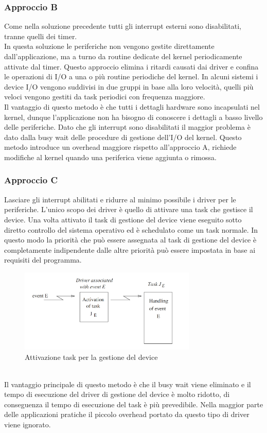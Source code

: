\documentclass[12pt]{article}
\begin{document}
\subsubsection{Approccio B}
Come nella soluzione precedente tutti gli interrupt esterni sono disabilitati,
tranne quelli dei timer.\\
In questa soluzione le periferiche non vengono gestite direttamente dall'applicazione, ma a turno da routine dedicate del kernel 
periodicamente attivate dal timer.
Questo approccio elimina i ritardi causati dai driver e confina le operazioni di I/O a una o più routine periodiche del kernel.
In alcuni sistemi i device I/O vengono suddivisi in due gruppi in base alla loro velocità, quelli più veloci vengono gestiti da task 
periodici con frequenza maggiore.
\\
Il vantaggio di questo metodo è che tutti i dettagli hardware sono incapsulati nel kernel, dunque l'applicazione non ha bisogno di 
conoscere i dettagli a basso livello delle periferiche.
Dato che gli interrupt sono disabilitati il maggior problema è dato dalla busy wait delle procedure di gestione dell'I/O del kernel.
Questo metodo introduce un overhead maggiore rispetto all'approccio A, richiede modifiche al kernel quando una periferica viene aggiunta o rimossa.
\subsubsection{Approccio C}
Lasciare gli interrupt abilitati e ridurre al minimo possibile i driver per le periferiche.
L'unico scopo dei driver è quello di attivare una task che gestisce il device. Una volta attivato il task di gestione del device 
viene eseguito sotto diretto controllo del sistema operativo
ed è schedulato come un task normale.
In questo modo la priorità che può essere assegnata al task di gestione del device è completamente indipendente dalle altre priorità 
può essere impostata in base ai requisiti del programma.
\begin{figure}[h]
\centering
\includegraphics[height=150px]{pictures/approccioC.png}
\caption{Attivazione task per la gestione del device}
\end{figure}
\\
Il vantaggio principale di questo metodo è che il busy wait viene eliminato e il tempo di esecuzione del driver di gestione del device è 
molto ridotto, di conseguenza il tempo di esecuzione del task è più prevedibile.
Nella maggior parte delle applicazioni pratiche il piccolo overhead portato da questo tipo di driver viene ignorato.
\end{document}

